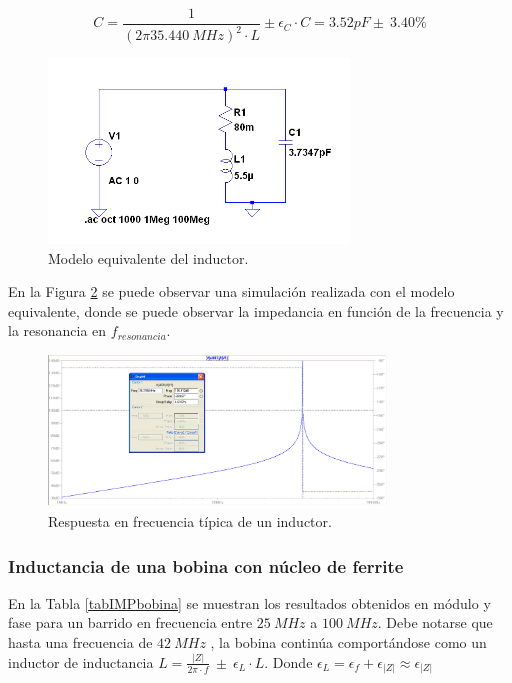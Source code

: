 \documentclass[a4paper,10pt]{article}
\begin{document}
		$$C=\frac{1}{(2\pi 35.440~MHz)^2 \cdot L}\pm \epsilon_C \cdot C=3.52pF \pm~3.40\%$$
		\begin{figure}[!htb]
			\centering
			\includegraphics[width=8cm]
			{Imagenes/induceqquiv.png}
			\caption{Modelo equivalente del inductor.}
			\label{inductorequiv} 
		\end{figure}
		
		\indent En la Figura \ref{respfreq} se puede observar una simulaci\'on 
		realizada con el modelo equivalente, donde se puede observar la 
		impedancia en funci\'on de la frecuencia y la resonancia en 
		$f_{resonancia}$.
		
		\begin{figure}[!htb]
			\centering
			\includegraphics[width=9cm]
			{Imagenes/respfreq.png}
			\caption{Respuesta en frecuencia t\'ipica de un inductor.}
			\label{respfreq} 
		\end{figure}
		
		\subsubsection{Inductancia de una bobina con n\'ucleo de ferrite}
		
		\indent En la Tabla \ref{tabIMPbobina} se muestran los resultados 
		obtenidos en m\'odulo y fase para un barrido en frecuencia entre 
		$25~MHz$ a $100~MHz$. Debe notarse que hasta una frecuencia de  $42~MHz$
		, la bobina contin\'ua comport\'andose como un inductor de inductancia 
		$L=\frac{\left|Z\right|}{2\pi\cdot f}~\pm~\epsilon_L\cdot L$. Donde 
		$\epsilon_L=\epsilon_f+\epsilon_{\left|Z\right|}\approx
		\epsilon_{\left|Z\right|}$
		
\end{document}

